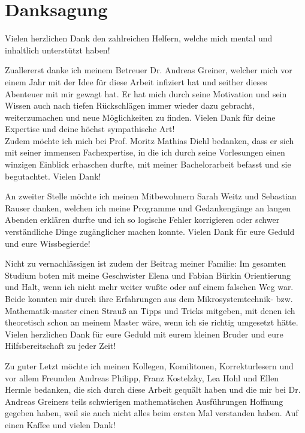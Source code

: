 \chapter{Danksagung}
Vielen herzlichen Dank den zahlreichen Helfern, welche mich mental und inhaltlich unterstützt haben!

Zuallererst danke ich meinem Betreuer Dr. Andreas Greiner, welcher mich vor einem Jahr mit der Idee für diese Arbeit infiziert hat und seither dieses Abenteuer mit mir gewagt hat. Er hat mich durch seine Motivation und sein Wissen auch nach tiefen Rückschlägen immer wieder dazu gebracht, weiterzumachen und neue Möglichkeiten zu finden. Vielen Dank für deine Expertise und deine höchst sympathische Art!\\
Zudem möchte ich mich bei Prof. Moritz Mathias Diehl bedanken, dass er sich mit seiner immensen Fachexpertise, in die ich durch seine Vorlesungen einen winzigen Einblick erhaschen durfte, mit meiner Bachelorarbeit befasst und sie begutachtet. Vielen Dank!

An zweiter Stelle möchte ich meinen Mitbewohnern Sarah Weitz und Sebastian Rauser danken, welchen ich meine Programme und Gedankengänge an langen Abenden erklären durfte und ich so logische Fehler korrigieren oder schwer verständliche Dinge zugänglicher machen konnte. Vielen Dank für eure Geduld und eure Wissbegierde!

Nicht zu vernachlässigen ist zudem der Beitrag meiner Familie: Im gesamten Studium boten mit meine Geschwister Elena und Fabian Bürkin Orientierung und Halt, wenn ich nicht mehr weiter wußte oder auf einem falschen Weg war. Beide konnten mir durch ihre Erfahrungen aus dem Mikrosystemtechnik- bzw. Mathematik-master einen Strauß an Tipps und Tricks mitgeben, mit denen ich theoretisch schon an meinem Master wäre, wenn ich sie richtig umgesetzt hätte. Vielen herzlichen Dank für eure Geduld mit eurem kleinen Bruder und eure Hilfsbereitschaft zu jeder Zeit!

Zu guter Letzt möchte ich meinen Kollegen, Komilitonen, Korrekturlesern und vor allem Freunden Andreas Philipp, Franz Kostelzky, Lea Hohl und Ellen Hermle bedanken, die sich durch diese Arbeit gequält haben und die mir bei Dr. Andreas Greiners teils schwierigen mathematischen Ausführungen Hoffnung gegeben haben, weil sie auch nicht alles beim ersten Mal verstanden haben. Auf einen Kaffee und vielen Dank!